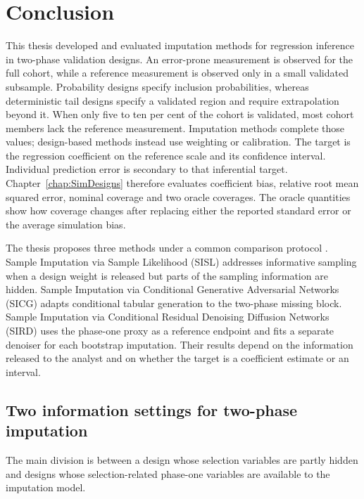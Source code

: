 \chapter{Conclusion}
\label{chap:conclusion}

This thesis developed and evaluated imputation methods for regression inference in two-phase validation designs. An error-prone measurement is observed for the full cohort, while a reference measurement is observed only in a small validated subsample. Probability designs specify inclusion probabilities, whereas deterministic tail designs specify a validated region and require extrapolation beyond it. When only five to ten per cent of the cohort is validated, most cohort members lack the reference measurement. Imputation methods complete those values; design-based methods instead use weighting or calibration. The target is the regression coefficient on the reference scale and its confidence interval. Individual prediction error is secondary to that inferential target. Chapter~\ref{chap:SimDesigns} therefore evaluates coefficient bias, relative root mean squared error, nominal coverage and two oracle coverages. The oracle quantities show how coverage changes after replacing either the reported standard error or the average simulation bias.

The thesis proposes three methods under a common comparison protocol \citep{amorim2021two}. Sample Imputation via Sample Likelihood (SISL) addresses informative sampling when a design weight is released but parts of the sampling information are hidden. Sample Imputation via Conditional Generative Adversarial Networks (SICG) adapts conditional tabular generation to the two-phase missing block. Sample Imputation via Conditional Residual Denoising Diffusion Networks (SIRD) uses the phase-one proxy as a reference endpoint and fits a separate denoiser for each bootstrap imputation. Their results depend on the information released to the analyst and on whether the target is a coefficient estimate or an interval.

\section{Two information settings for two-phase imputation}
\label{sec:conc_regimes}

The main division is between a design whose selection variables are partly hidden and designs whose selection-related phase-one variables are available to the imputation model.

